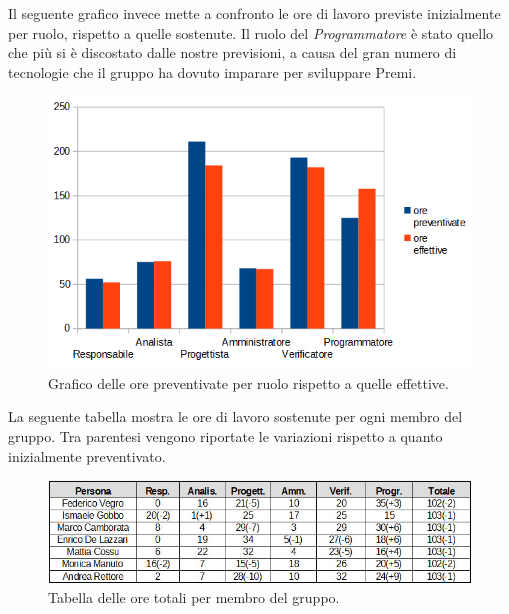 Il seguente grafico invece mette a confronto le ore di lavoro previste inizialmente per ruolo, rispetto a quelle sostenute. Il ruolo del \textit{Programmatore} è stato quello che più si è discostato dalle nostre previsioni, a causa del gran numero di tecnologie che il gruppo ha dovuto imparare per sviluppare Premi.

\begin{figure}[H]
\begin{center}
\includegraphics[scale=0.70]{img/tot-ruoli-grafico.jpg}
\caption{Grafico delle ore preventivate per ruolo rispetto a quelle effettive.}
\end{center}
\end{figure}

La seguente tabella mostra le ore di lavoro sostenute per ogni membro del gruppo. Tra parentesi vengono riportate le variazioni rispetto a quanto inizialmente preventivato.
\begin{figure}[H]
\begin{center}
\includegraphics[scale=0.60]{img/tot-persone.jpg}
\caption{Tabella delle ore totali per membro del gruppo.}
\end{center}
\end{figure}



